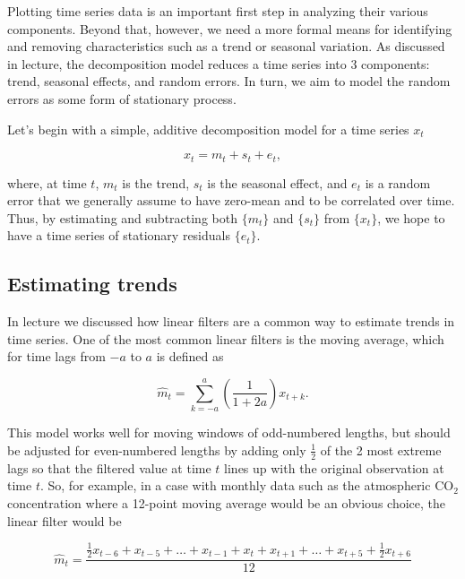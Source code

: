 Plotting time series data is an important first step in analyzing their various components.  Beyond that, however, we need a more formal means for identifying and removing characteristics such as a trend or seasonal variation.  As discussed in lecture, the decomposition model reduces a time series into 3 components: trend, seasonal effects, and random errors.  In turn, we aim to model the random errors as some form of stationary process.

Let's begin with a simple, additive decomposition model for a time series $x_t$

\begin{equation}\label{eqn:classDecomp}
x_t = m_t + s_t + e_t,
\end{equation}

\noindent where, at time $t$, $m_t$ is the trend, $s_t$ is the seasonal effect, and $e_t$ is a random error that we generally assume to have zero-mean and to be correlated over time.  Thus, by estimating and subtracting both $\{m_t\}$ and $\{s_t\}$ from $\{x_t\}$, we hope to have a time series of stationary residuals $\{e_t\}$.

\subsection{Estimating trends}

In lecture we discussed how linear filters are a common way to estimate trends in time series.  One of the most common linear filters is the moving average, which for time lags from $-a$ to $a$ is defined as

\begin{equation}\label{eqn:linearFilter}
\hat{m}_t = \sum_{k=-a}^{a} \left(\frac{1}{1+2a}\right) x_{t+k}.
\end{equation}

\noindent This model works well for moving windows of odd-numbered lengths, but should be adjusted for even-numbered lengths by adding only $\frac{1}{2}$ of the 2 most extreme lags so that the filtered value at time $t$ lines up with the original observation at time $t$.  So, for example, in a case with monthly data such as the atmospheric CO$_2$ concentration where a 12-point moving average would be an obvious choice, the linear filter would be

\begin{equation}\label{eqn:linearFilterEx}
\hat{m}_t = \frac{\frac{1}{2}x_{t-6} + x_{t-5} + \dots + x_{t-1} + x_t + x_{t+1} + \dots + x_{t+5} + \frac{1}{2}x_{t+6}}{12}
\end{equation}

